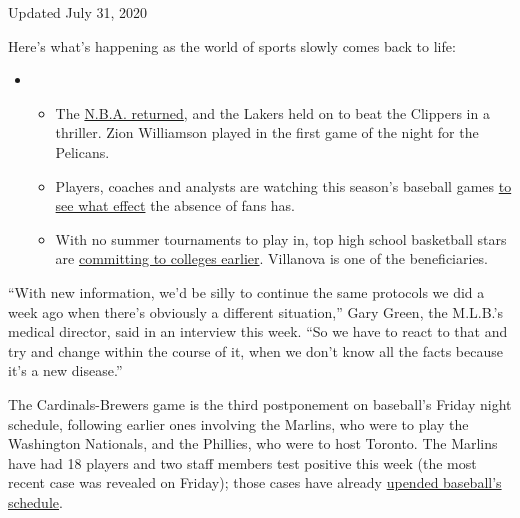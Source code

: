 Updated July 31, 2020

Here's what's happening as the world of sports slowly comes back to
life:

\begin{itemize}
\item
  \begin{itemize}
  \tightlist
  \item
    The
    \href{https://www.nytimes.com/2020/07/30/sports/basketball/clippers-lakers.html?action=click\&pgtype=Article\&state=default\&region=MAIN_CONTENT_2\&context=storylines_keepup}{N.B.A.
    returned}, and the Lakers held on to beat the Clippers in a
    thriller. Zion Williamson played in the first game of the night for
    the Pelicans.
  \item
    Players, coaches and analysts are watching this season's baseball
    games
    \href{https://www.nytimes.com/2020/07/31/sports/baseball/baseball-empty-stadiums-effects.html?action=click\&pgtype=Article\&state=default\&region=MAIN_CONTENT_2\&context=storylines_keepup}{to
    see what effect} the absence of fans has.
  \item
    With no summer tournaments to play in, top high school basketball
    stars are
    \href{https://www.nytimes.com/2020/07/30/sports/ncaabasketball/college-basketball-recruiting.html?action=click\&pgtype=Article\&state=default\&region=MAIN_CONTENT_2\&context=storylines_keepup}{committing
    to colleges earlier}. Villanova is one of the beneficiaries.
  \end{itemize}
\end{itemize}

``With new information, we'd be silly to continue the same protocols we
did a week ago when there's obviously a different situation,'' Gary
Green, the M.L.B.'s medical director, said in an interview this week.
``So we have to react to that and try and change within the course of
it, when we don't know all the facts because it's a new disease.''

The Cardinals-Brewers game is the third postponement on baseball's
Friday night schedule, following earlier ones involving the Marlins, who
were to play the Washington Nationals, and the Phillies, who were to
host Toronto. The Marlins have had 18 players and two staff members test
positive this week (the most recent case was revealed on Friday); those
cases have already
\href{https://www.nytimes.com/2020/07/28/sports/baseball/marlins-outbreak-mlb-coronavirus.html}{upended
baseball's schedule}.

